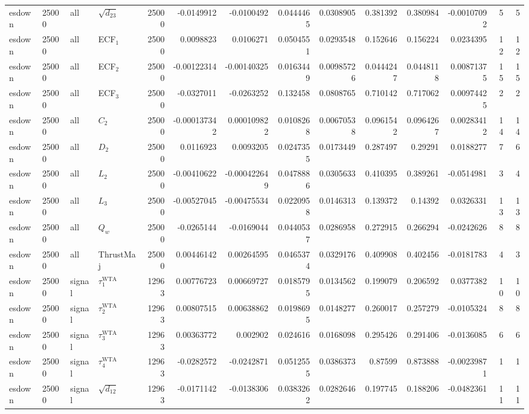 \begin{landscape}
\begin{longtable}{llll r rrrr rr r rr}
esdown & 25000 & all & $\sqrt{d_{23}}$ & 25000 & -0.0149912 & -0.0100492 & 0.0444465 & 0.0308905 & 0.381392 & 0.380984 & -0.00107092 & 5 & 5 \\
esdown & 25000 & all & ECF$_1$ & 25000 & 0.0098823 & 0.0106271 & 0.0504551 & 0.0293548 & 0.152646 & 0.156224 & 0.0234395 & 12 & 12 \\
esdown & 25000 & all & ECF$_2$ & 25000 & -0.00122314 & -0.00140325 & 0.0163449 & 0.00985726 & 0.0444247 & 0.0448118 & 0.00871375 & 15 & 15 \\
esdown & 25000 & all & ECF$_3$ & 25000 & -0.0327011 & -0.0263252 & 0.132458 & 0.0808765 & 0.710142 & 0.717062 & 0.00974425 & 2 & 2 \\
esdown & 25000 & all & $C_2$ & 25000 & -0.000137342 & 0.000109822 & 0.0108268 & 0.00670538 & 0.0961542 & 0.0964267 & 0.00283412 & 14 & 14 \\
esdown & 25000 & all & $D_2$ & 25000 & 0.0116923 & 0.0093205 & 0.0247355 & 0.0173449 & 0.287497 & 0.29291 & 0.0188277 & 7 & 6 \\
esdown & 25000 & all & $L_2$ & 25000 & -0.00410622 & -0.000422649 & 0.0478886 & 0.0305633 & 0.410395 & 0.389261 & -0.0514981 & 3 & 4 \\
esdown & 25000 & all & $L_3$ & 25000 & -0.00527045 & -0.00475534 & 0.0220958 & 0.0146313 & 0.139372 & 0.14392 & 0.0326331 & 13 & 13 \\
esdown & 25000 & all & $Q_w$ & 25000 & -0.0265144 & -0.0169044 & 0.0440537 & 0.0286958 & 0.272915 & 0.266294 & -0.0242626 & 8 & 8 \\
esdown & 25000 & all & ThrustMaj & 25000 & 0.00446142 & 0.00264595 & 0.0465374 & 0.0329176 & 0.409908 & 0.402456 & -0.0181783 & 4 & 3 \\
esdown & 25000 & signal & $\tau_1^{\mathrm{WTA}}$ & 12963 & 0.00776723 & 0.00669727 & 0.0185795 & 0.0134562 & 0.199079 & 0.206592 & 0.0377382 & 10 & 10 \\
esdown & 25000 & signal & $\tau_2^{\mathrm{WTA}}$ & 12963 & 0.00807515 & 0.00638862 & 0.0198695 & 0.0148277 & 0.260017 & 0.257279 & -0.0105324 & 8 & 8 \\
esdown & 25000 & signal & $\tau_3^{\mathrm{WTA}}$ & 12963 & 0.00363772 & 0.002902 & 0.024616 & 0.0168098 & 0.295426 & 0.291406 & -0.0136085 & 6 & 6 \\
esdown & 25000 & signal & $\tau_4^{\mathrm{WTA}}$ & 12963 & -0.0282572 & -0.0242871 & 0.0512555 & 0.0386373 & 0.87599 & 0.873888 & -0.00239871 & 1 & 1 \\
esdown & 25000 & signal & $\sqrt{d_{12}}$ & 12963 & -0.0171142 & -0.0138306 & 0.0383262 & 0.0282646 & 0.197745 & 0.188206 & -0.0482361 & 11 & 11 \\

\end{longtable}
\end{landscape}
